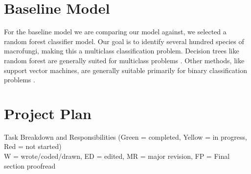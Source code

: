 \documentclass{article} %
\begin{document}
\section{Baseline Model}
For the baseline model we are comparing our model against, we selected a random forest classifier model. Our goal is to identify several hundred species of macrofungi, making this a multiclass classification problem. Decision trees like random forest are generally suited for multiclass problems \citep{BreimanCutler.RandomForests.2004}. Other methods, like support vector machines, are generally suitable primarily for binary classification problems \citep{JamesWittenEtAl.IntroductionStatisticalLearning.2023}.

\section{Project Plan}
Task Breakdown and Responsibilities (Green = completed, Yellow = in progress, Red = not started)\\
W = wrote/coded/drawn, ED = edited, MR = major revision, FP = Final section proofread
\end{document}
